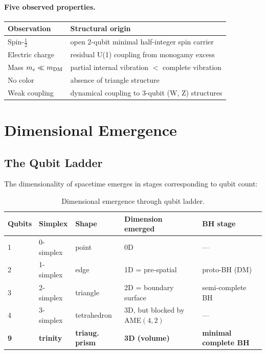 \documentclass[11pt,a4paper]{article}
\begin{document}
\paragraph{Five observed properties.}
\begin{table}[h]
\centering
\begin{tabular}{ll}
\toprule
\textbf{Observation} & \textbf{Structural origin} \\
\midrule
Spin-$\tfrac{1}{2}$ & open 2-qubit minimal half-integer spin carrier \\
Electric charge & residual U(1) coupling from monogamy excess \\
Mass $m_e \ll m_{\rm DM}$ & partial internal vibration $<$ complete vibration \\
No color & absence of triangle structure \\
Weak coupling & dynamical coupling to 3-qubit (W, Z) structures \\
\bottomrule
\end{tabular}
\end{table}

\section{Dimensional Emergence}
\label{sec:dimensions}

\subsection{The Qubit Ladder}

The dimensionality of spacetime emerges in stages corresponding to qubit count:

\begin{table}[h]
\centering
\small
\begin{tabular}{lllll}
\toprule
\textbf{Qubits} & \textbf{Simplex} & \textbf{Shape} & \textbf{Dimension emerged} & \textbf{BH stage} \\
\midrule
1 & 0-simplex & point & 0D & --- \\
2 & 1-simplex & edge & 1D = pre-spatial & proto-BH (DM) \\
3 & 2-simplex & triangle & 2D = boundary surface & semi-complete BH \\
4 & 3-simplex & tetrahedron & 3D, but blocked by AME$(4,2)$ & --- \\
\textbf{9} & \textbf{trinity} & \textbf{triaug. prism} & \textbf{3D (volume)} & \textbf{minimal complete BH} \\
\bottomrule
\end{tabular}
\caption{Dimensional emergence through qubit ladder.}
\end{table}
\end{document}
